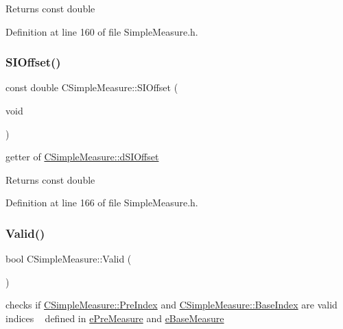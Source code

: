 \begin{DoxyReturn}{Returns}
const double 
\end{DoxyReturn}


Definition at line 160 of file Simple\+Measure.\+h.

\mbox{\label{classCSimpleMeasure_a6e04ea2506105c069ae28650c5d69733}} 
\subsubsection{\texorpdfstring{S\+I\+Offset()}{SIOffset()}}
{\footnotesize\ttfamily const double C\+Simple\+Measure\+::\+S\+I\+Offset (\begin{DoxyParamCaption}\item[{void}]{ }\end{DoxyParamCaption})\hspace{0.3cm}{\ttfamily [inline]}}



getter of \hyperlink{classCSimpleMeasure_a27c1637c744a79856ee81869e2aa8890}{C\+Simple\+Measure\+::d\+S\+I\+Offset} 

\begin{DoxyReturn}{Returns}
const double 
\end{DoxyReturn}


Definition at line 166 of file Simple\+Measure.\+h.

\mbox{\label{classCSimpleMeasure_ac4c8b1c22393c6d9a6381f3d8dfdf3e4}} 
\subsubsection{\texorpdfstring{Valid()}{Valid()}}
{\footnotesize\ttfamily bool C\+Simple\+Measure\+::\+Valid (\begin{DoxyParamCaption}{ }\end{DoxyParamCaption})\hspace{0.3cm}{\ttfamily [inline]}}



checks if \hyperlink{classCSimpleMeasure_aa23ed9eec21adb9a97c90a424e7ee18a}{C\+Simple\+Measure\+::\+Pre\+Index} and \hyperlink{classCSimpleMeasure_a191dbfa4cc374946bf8a82111f827d92}{C\+Simple\+Measure\+::\+Base\+Index} are valid indices ~\newline
 defined in \hyperlink{PreMeasure_8h_a6c81167b8d4c2badde42f81cb7214620}{e\+Pre\+Measure} and \hyperlink{BaseMeasure_8h_ac90e5164ccf1f0d648fba7e94b229a11}{e\+Base\+Measure} 

